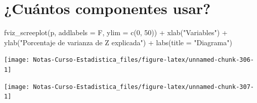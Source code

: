\documentclass[
  12pt,
]{book}
\newenvironment{Shaded}{\begin{snugshade}}{\end{snugshade}}
\newcommand{\AttributeTok}[1]{\textcolor[rgb]{0.77,0.63,0.00}{#1}}
\newcommand{\DecValTok}[1]{\textcolor[rgb]{0.00,0.00,0.81}{#1}}
\newcommand{\FunctionTok}[1]{\textcolor[rgb]{0.00,0.00,0.00}{#1}}
\newcommand{\NormalTok}[1]{#1}
\newcommand{\SpecialCharTok}[1]{\textcolor[rgb]{0.00,0.00,0.00}{#1}}
\newcommand{\StringTok}[1]{\textcolor[rgb]{0.31,0.60,0.02}{#1}}
\theoremstyle{definition}
\theoremstyle{definition}
\theoremstyle{definition}
\theoremstyle{definition}
\theoremstyle{remark}
\begin{document}
\hypertarget{cuuxe1ntos-componentes-usar}{%
\section{¿Cuántos componentes usar?}\label{cuuxe1ntos-componentes-usar}}

\begin{Shaded}
\begin{Highlighting}[]
\FunctionTok{fviz\_screeplot}\NormalTok{(p, }\AttributeTok{addlabels =}\NormalTok{ F, }\AttributeTok{ylim =} \FunctionTok{c}\NormalTok{(}\DecValTok{0}\NormalTok{, }\DecValTok{50}\NormalTok{)) }\SpecialCharTok{+}
    \FunctionTok{xlab}\NormalTok{(}\StringTok{"Variables"}\NormalTok{) }\SpecialCharTok{+} \FunctionTok{ylab}\NormalTok{(}\StringTok{"Porcentaje de varianza de Z explicada"}\NormalTok{) }\SpecialCharTok{+}
    \FunctionTok{labs}\NormalTok{(}\AttributeTok{title =} \StringTok{"Diagrama"}\NormalTok{)}
\end{Highlighting}
\end{Shaded}

\begin{center}\texttt{[image: Notas-Curso-Estadistica\_files/figure-latex/unnamed-chunk-306-1]} \end{center}

\begin{Shaded}
\end{Shaded}

\begin{center}\texttt{[image: Notas-Curso-Estadistica\_files/figure-latex/unnamed-chunk-307-1]} \end{center}
\end{document}
